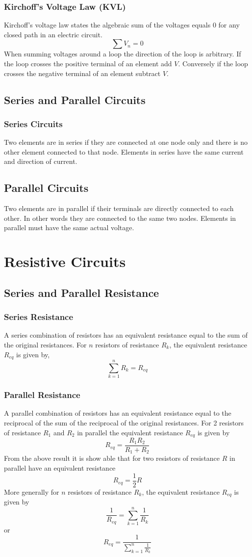 \documentclass[14pt]{article}
\begin{document}
    \subsubsection{Kirchoff's Voltage Law (KVL)}
    Kirchoff's voltage law states the algebraic sum of the voltages equals 0 for any closed path in an electric circuit.
    $$\sum V_n=0$$
    When summing voltages around a loop the direction of the loop is arbitrary.
    If the loop crosses the positive terminal of an element add $V$. Conversely if the loop crosses the negative terminal of an element subtract $V$.
    \subsection{Series and Parallel Circuits}
    \subsubsection{Series Circuits}
    Two elements are in series if they are connected at one node only and there is no other element connected to that node. Elements in series have the same current and direction of current.
    \subsection{Parallel Circuits}
    Two elements are in parallel if their terminals are directly connected to each other. In other words they are connected to the same two nodes. Elements in parallel must have the same actual voltage.
    \section{Resistive Circuits}
    \subsection{Series and Parallel Resistance}
    \subsubsection{Series Resistance}
    A series combination of resistors has an equivalent resistance equal to the sum of the original resistances. For $n$ resistors of resistance $R_k$, the equivalent resistance $R_{eq}$ is given by,
    $$\sum\limits_{k=1}^nR_k=R_{eq}$$
    \subsubsection{Parallel Resistance}
    A parallel combination of resistors has an equivalent resistance equal to the reciprocal of the sum of the reciprocal of the original resistances. For 2 resistors of resistance $R_1$ and $R_2$ in parallel the equivalent resistance $R_{eq}$ is given by $$R_{eq}=\frac{R_1R_2}{R_1+R_2}$$ From the above result it is show able that for two resistors of resistance $R$ in parallel have an equivalent resistance 
    $$R_{eq}=\frac{1}{2}R$$
    More generally for $n$ resistors of resistance $R_k$, the equivalent resistance $R_{eq}$ is given by
    $$\frac{1}{R_{eq}}=\sum\limits_{k=1}^n\frac{1}{R_k}$$
    or $$R_{eq}=\frac{1}{\sum\limits_{k=1}^n\frac{1}{R_k}}$$
\end{document}
